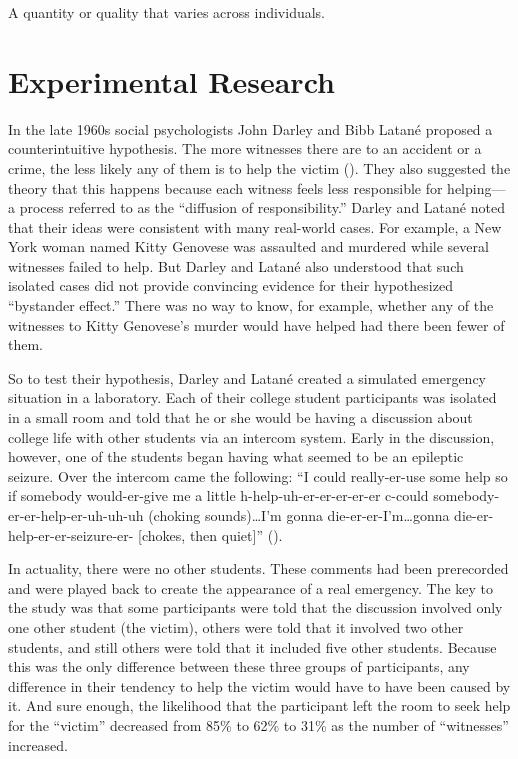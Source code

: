 \documentclass[
]{krantz}
\begin{document}
A quantity or quality that varies across individuals.

\chapter{Experimental Research}\label{experimental-research}

In the late 1960s social psychologists John Darley and Bibb Latané proposed a counterintuitive hypothesis. The more witnesses there are to an accident or a crime, the less likely any of them is to help the victim (). They also suggested the theory that this happens because each witness feels less responsible for helping---a process referred to as the ``diffusion of responsibility.'' Darley and Latané noted that their ideas were consistent with many real-world cases. For example, a New York woman named Kitty Genovese was assaulted and murdered while several witnesses failed to help. But Darley and Latané also understood that such isolated cases did not provide convincing evidence for their hypothesized ``bystander effect.'' There was no way to know, for example, whether any of the witnesses to Kitty Genovese's murder would have helped had there been fewer of them.

So to test their hypothesis, Darley and Latané created a simulated emergency situation in a laboratory. Each of their college student participants was isolated in a small room and told that he or she would be having a discussion about college life with other students via an intercom system. Early in the discussion, however, one of the students began having what seemed to be an epileptic seizure. Over the intercom came the following: ``I could really-er-use some help so if somebody would-er-give me a little h-help-uh-er-er-er-er-er c-could somebody-er-er-help-er-uh-uh-uh (choking sounds)\ldots I'm gonna die-er-er-I'm\ldots gonna die-er-help-er-er-seizure-er- {[}chokes, then quiet{]}'' ().

In actuality, there were no other students. These comments had been prerecorded and were played back to create the appearance of a real emergency. The key to the study was that some participants were told that the discussion involved only one other student (the victim), others were told that it involved two other students, and still others were told that it included five other students. Because this was the only difference between these three groups of participants, any difference in their tendency to help the victim would have to have been caused by it. And sure enough, the likelihood that the participant left the room to seek help for the ``victim'' decreased from 85\% to 62\% to 31\% as the number of ``witnesses'' increased.
\end{document}
